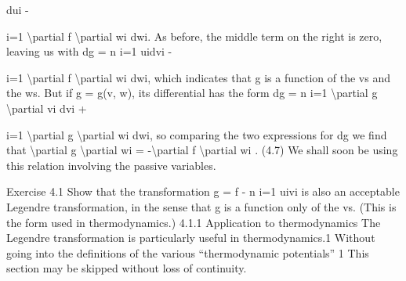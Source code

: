 dui -

i=1
\textbackslash{}partial f
\textbackslash{}partial wi
dwi.
As before, the middle term on the right is zero, leaving us with
dg =
n
i=1
uidvi -

i=1
\textbackslash{}partial f
\textbackslash{}partial wi
dwi,
which indicates that g is a function of the vs and the ws. But if g = g(v, w),
its differential has the form
dg =
n
i=1
\textbackslash{}partial g
\textbackslash{}partial vi
dvi +

i=1
\textbackslash{}partial g
\textbackslash{}partial wi
dwi,
so comparing the two expressions for dg we find that
\textbackslash{}partial g
\textbackslash{}partial wi
= -\textbackslash{}partial f
\textbackslash{}partial wi
.
(4.7)
We shall soon be using this relation involving the passive variables.
\begin{exercise}
Exercise 4.1 Show that the transformation g = f -
n
i=1
uivi is also an
acceptable Legendre transformation, in the sense that g is a function only
of the vs. (This is the form used in thermodynamics.)
4.1.1 Application to thermodynamics
The Legendre transformation is particularly useful in thermodynamics.1
Without going into the definitions of the various ``thermodynamic potentials''
1 This section may be skipped without loss of continuity.


\end{exercise}
